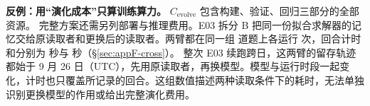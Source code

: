 \begin{pitfallbox}
\textbf{反例：用“演化成本”只算训练算力。}
$C_{\text{evolve}}$ 包含构建、验证、回归三部分的全部资源。
完整方案还需另列部署与推理费用。E03 拆分 B 把同一份拟合求解器的记忆交给原读取者和更换后的读取者。两臂都在同一组  道题上各运行  次，回合计时和分别为  秒与  秒（§\ref{sec:appF-cross}）。
整次 E03 续跑跨日，这两臂的留存轨迹都始于 9 月 26 日（UTC），先用原读取者，再换模型。模型与运行时段一起变化，计时也只覆盖所记录的回合。这组数值描述两种读取条件下的耗时，无法单独识别更换模型的作用或给出完整演化费用。
\end{pitfallbox}

